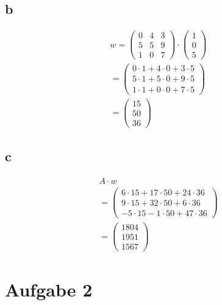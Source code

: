 \subsection{b}
\begin{align*}
    w = \begin{pmatrix}
            0 & 4 & 3 \\ 5 & 5 & 9 \\ 1 & 0 & 7
        \end{pmatrix} \cdot \begin{pmatrix}
                                1 \\ 0 \\ 5
                            \end{pmatrix}                                                                       \\
    = \begin{pmatrix}
          0 \cdot 1 + 4 \cdot 0 + 3 \cdot 5 \\ 5 \cdot 1 + 5 \cdot 0 + 9 \cdot 5 \\ 1 \cdot 1 + 0 \cdot 0 + 7 \cdot 5
      \end{pmatrix} \\
    = \begin{pmatrix}
          15 \\ 50 \\ 36
      \end{pmatrix}
\end{align*}

\subsection{c}
\begin{align*}
    A \cdot w                                \\
    = \begin{pmatrix}
          6 \cdot 15 + 17 \cdot 50 + 24 \cdot 36 \\
          9 \cdot 15 + 32 \cdot 50 + 6 \cdot 36  \\
          -5 \cdot 15 - 1 \cdot 50 + 47 \cdot 36
      \end{pmatrix} \\
    = \begin{pmatrix}
          1804 \\ 1951 \\ 1567
      \end{pmatrix}
\end{align*}

\section{Aufgabe 2}

